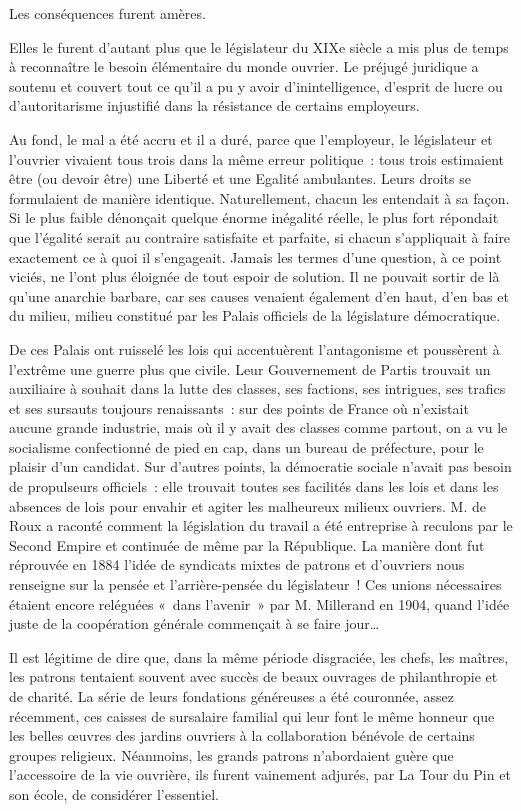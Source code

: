 \documentclass[french,twoside]{book} %
\begin{document}
Les conséquences furent amères.\par
Elles le furent d’autant plus que le législateur du XIXe siècle a mis plus de temps à reconnaître le besoin élémentaire du monde ouvrier. Le préjugé juridique a soutenu et couvert tout ce qu’il a pu y avoir d’inintelligence, d’esprit de lucre ou d’autoritarisme injustifié dans la résistance de certains employeurs.\par
Au fond, le mal a été accru et il a duré, parce que l’employeur, le législateur et l’ouvrier vivaient tous trois dans la même erreur politique : tous trois estimaient être (ou devoir être) une Liberté et une Egalité ambulantes. Leurs droits se formulaient de manière identique. Naturellement, chacun les entendait à sa façon. Si le plus faible dénonçait quelque énorme inégalité réelle, le plus fort répondait que l’égalité serait au contraire satisfaite et parfaite, si chacun s’appliquait à faire exactement ce à quoi il s’engageait. Jamais les termes d’une question, à ce point viciés, ne l’ont plus éloignée de tout espoir de solution. Il ne pouvait sortir de là qu’une anarchie barbare, car ses causes venaient également d’en haut, d’en bas et du milieu, milieu constitué par les Palais officiels de la législature démocratique.\par
De ces Palais ont ruisselé les lois qui accentuèrent l’antagonisme et poussèrent à l’extrême une guerre plus que civile. Leur Gouvernement de Partis trouvait un auxiliaire à souhait dans la lutte des classes, ses factions, ses intrigues, ses trafics et ses sursauts toujours renaissants : sur des points de France où n’existait aucune grande industrie, mais où il y avait des classes comme partout, on a vu le socialisme confectionné de pied en cap, dans un bureau de préfecture, pour le plaisir d’un candidat. Sur d’autres points, la démocratie sociale n’avait pas besoin de propulseurs officiels : elle trouvait toutes ses facilités dans les lois et dans les absences de lois pour envahir et agiter les malheureux milieux ouvriers. M. de Roux a raconté comment la législation du travail a été entreprise à reculons par le Second Empire et continuée de même par la République. La manière dont fut réprouvée en 1884 l’idée de syndicats mixtes de patrons et d’ouvriers nous renseigne sur la pensée et l’arrière-pensée du législateur ! Ces unions nécessaires étaient encore reléguées « dans l’avenir » par M. Millerand en 1904, quand l’idée juste de la coopération générale commençait à se faire jour…\par
Il est légitime de dire que, dans la même période disgraciée, les chefs, les maîtres, les patrons tentaient souvent avec succès de beaux ouvrages de philanthropie et de charité. La série de leurs fondations généreuses a été couronnée, assez récemment, ces caisses de sursalaire familial qui leur font le même honneur que les belles œuvres des jardins ouvriers à la collaboration bénévole de certains groupes religieux. Néanmoins, les grands patrons n’abordaient guère que l’accessoire de la vie ouvrière, ils furent vainement adjurés, par La Tour du Pin et son école, de considérer l’essentiel.\par
\end{document}

